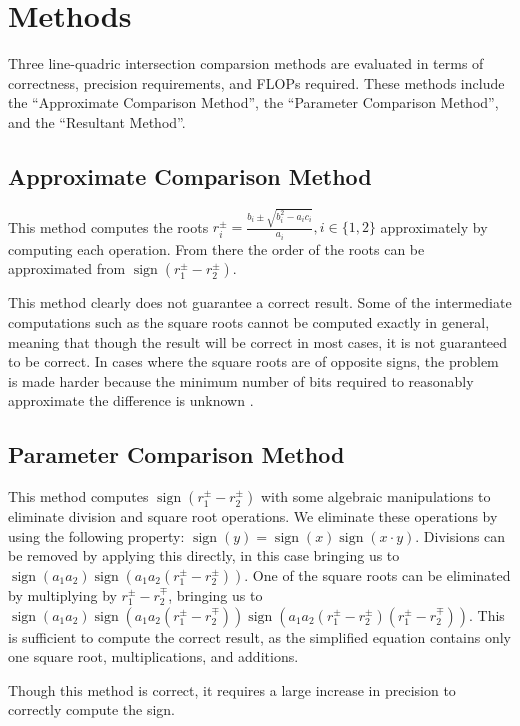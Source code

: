 \documentclass{cccg16}
\DeclareMathOperator{\sign}{sign}
\begin{document}
\section{Methods}
Three line-quadric intersection comparsion methods are evaluated in
terms of correctness, precision requirements, and FLOPs required.
These methods include the ``Approximate Comparison Method'', the
``Parameter Comparison Method'', and the ``Resultant Method''.

\subsection{Approximate Comparison Method}
This method computes the roots
$r_i^\pm=\frac{b_i\pm\sqrt{b_i^2-a_ic_i}}{a_i}, i\in\{1, 2\}$
approximately by computing each operation.  From there the order of
the roots can be approximated from $\sign(r_1^\pm-r_2^\pm)$.

This method clearly does not guarantee a correct result.  Some of the
intermediate computations such as the square roots cannot be computed
exactly in general, meaning that though the result will be correct in
most cases, it is not guaranteed to be correct.  In cases where the
square roots are of opposite signs, the problem is made harder because
the minimum number of bits required to reasonably approximate the
difference is unknown \cite{demaine33open}.

\subsection{Parameter Comparison Method}
This method computes $\sign(r_1^\pm-r_2^\pm)$ with some algebraic
manipulations to eliminate division and square root operations.  We
eliminate these operations by using the following property:
$\sign(y)=\sign(x)\sign(x\cdot y)$.  Divisions can be removed by
applying this directly, in this case bringing us to $\sign(a_1
a_2)\sign(a_1 a_2 (r_1^\pm-r_2^\pm))$.  One of the square roots can be
eliminated by multiplying by $r_1^\pm-r_2^\mp$, bringing us to
$\sign(a_1 a_2)\sign(a_1 a_2 (r_1^\pm-r_2^\mp))\sign(a_1 a_2 (r_1^\pm
- r_2^\pm) (r_1^\pm - r_2^\mp))$.  This is sufficient to compute the
correct result, as the simplified equation contains only one square
root, multiplications, and additions.

Though this method is correct, it requires a large increase in
precision to correctly compute the sign.
\end{document}
